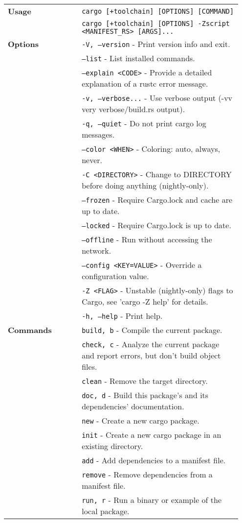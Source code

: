 \begin{longtable}{|p{0.3\linewidth}|p{0.65\linewidth}|}
	\textbf{Usage} & \texttt{cargo [+toolchain] [OPTIONS] [COMMAND]} \\
	& \texttt{cargo [+toolchain] [OPTIONS] -Zscript <MANIFEST\_RS> [ARGS]...} \\
	\hline
	\textbf{Options} & 
	\texttt{-V, --version} - Print version info and exit. \\
	& \texttt{--list} - List installed commands. \\
	& \texttt{--explain <CODE>} - Provide a detailed explanation of a rustc error message. \\
	& \texttt{-v, --verbose...} - Use verbose output (-vv very verbose/build.rs output). \\
	& \texttt{-q, --quiet} - Do not print cargo log messages. \\
	& \texttt{--color <WHEN>} - Coloring: auto, always, never. \\
	& \texttt{-C <DIRECTORY>} - Change to DIRECTORY before doing anything (nightly-only). \\
	& \texttt{--frozen} - Require Cargo.lock and cache are up to date. \\
	& \texttt{--locked} - Require Cargo.lock is up to date. \\
	& \texttt{--offline} - Run without accessing the network. \\
	& \texttt{--config <KEY=VALUE>} - Override a configuration value. \\
	& \texttt{-Z <FLAG>} - Unstable (nightly-only) flags to Cargo, see 'cargo -Z help' for details. \\
	& \texttt{-h, --help} - Print help. \\
	\hline
	\textbf{Commands} & 
	\texttt{build, b} - Compile the current package. \\
	& \texttt{check, c} - Analyze the current package and report errors, but don't build object files. \\
	& \texttt{clean} - Remove the target directory. \\
	& \texttt{doc, d} - Build this package's and its dependencies' documentation. \\
	& \texttt{new} - Create a new cargo package. \\
	& \texttt{init} - Create a new cargo package in an existing directory. \\
	& \texttt{add} - Add dependencies to a manifest file. \\
	& \texttt{remove} - Remove dependencies from a manifest file. \\
	& \texttt{run, r} - Run a binary or example of the local package. \\

\end{longtable}
